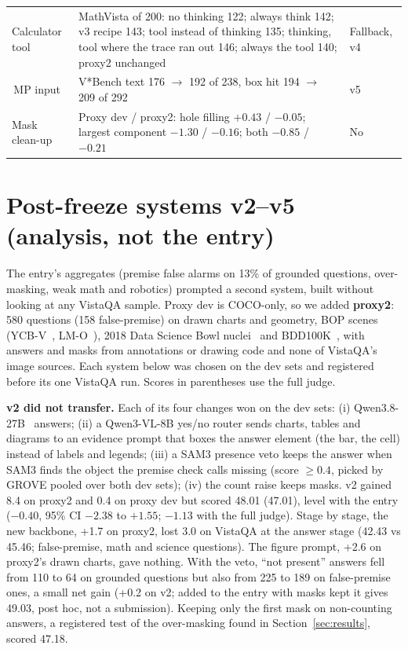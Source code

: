 \documentclass{article}
\begin{document}
\begin{table}[!htbp]
\begin{tabular}{@{}>{\raggedright\arraybackslash}p{1.15in}>{\raggedright\arraybackslash}p{3.4in}>{\raggedright\arraybackslash}p{.6in}@{}}
Calculator tool & MathVista of 200: no thinking 122; always think 142; v3 recipe 143; tool instead of thinking 135; thinking, tool where the trace ran out 146; always the tool 140; proxy2 unchanged & Fallback, v4 \\
4\,MP input & V*Bench text 176 $\to$ 192 of 238, box hit 194 $\to$ 209 of 292 & v5 \\
Mask clean-up & Proxy dev / proxy2: hole filling $+0.43$ / $-0.05$; largest component $-1.30$ / $-0.16$; both $-0.85$ / $-0.21$ & No \\
\bottomrule
\end{tabular}
\end{table}

\section{Post-freeze systems v2--v5 (analysis, not the entry)}\label{app:v2}
The entry's aggregates (premise false alarms on 13\% of grounded questions, over-masking, weak math and robotics) prompted a
second system, built without looking at any VistaQA sample. Proxy dev is COCO-only, so we added \textbf{proxy2}: 580 questions
(158 false-premise) on drawn charts and geometry, BOP scenes~\cite{bop23} (YCB-V~\cite{posecnn}, LM-O~\cite{lmo}), 2018 Data
Science Bowl nuclei~\cite{dsb2018} and BDD100K~\cite{bdd100k}, with answers and masks from annotations or drawing code and
none of VistaQA's image sources. Each system below was chosen on the dev sets and registered before its one VistaQA run. Scores
in parentheses use the full judge.

\textbf{v2 did not transfer.} Each of its four changes won on the dev sets: (i) Qwen3.8-27B~\cite{qwen38} answers; (ii) a
Qwen3-VL-8B yes/no router sends charts, tables and diagrams to an evidence prompt that boxes the answer element (the bar, the
cell) instead of labels and legends; (iii) a SAM3 presence veto keeps the answer when SAM3 finds the object the premise check
calls missing (score $\geq 0.4$, picked by GROVE pooled over both dev sets); (iv) the count raise keeps masks. v2 gained 8.4 on
proxy2 and 0.4 on proxy dev but scored 48.01 (47.01), level with the entry ($-0.40$, 95\% CI $-2.38$ to $+1.55$; $-1.13$ with
the full judge). Stage by stage, the new backbone, +1.7 on proxy2, lost 3.0 on VistaQA at the answer stage (42.43 vs 45.46;
false-premise, math and science questions). The figure prompt, +2.6 on proxy2's drawn charts, gave nothing. With the veto,
``not present'' answers fell from 110 to 64 on grounded questions but also from 225 to 189 on false-premise ones, a small net
gain (+0.2 on v2; added to the entry with masks kept it gives 49.03, post hoc, not a submission). Keeping only the first mask on
non-counting answers, a registered test of the over-masking found in Section~\ref{sec:results}, scored 47.18.
\end{document}
